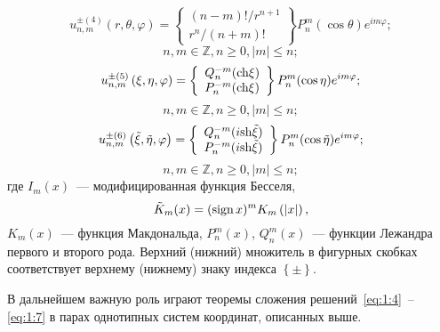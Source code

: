 \begin{equation}\label{eq:1:5}
u_{n,m}^{ \pm (4)}\left( {r,\theta ,\varphi } \right) = \left\{ \begin{array}{l}
(n - m)!/{r^{n + 1}}\\
{r^n}/(n + m)!
\end{array} \right\}P_n^m(\cos \theta ){e^{im\varphi }};
\end{equation}
$$
n,m \in \mathbb{Z}, n\ge 0, |m| \le n;
$$
\begin{equation}\label{eq:1:6}
u_{n,m}^{ \pm (5)}\left( {\xi ,\eta ,\varphi } \right) = \left\{ \begin{array}{l}
Q_n^{ - m}({\mathop{\rm ch}\nolimits} \xi )\\
P_n^{ - m}({\mathop{\rm ch}\nolimits} \xi )
\end{array} \right\}P_n^m(\cos \eta ){e^{im\varphi }};
\end{equation}
$$
n,m \in \mathbb{Z}, n\ge 0, |m| \le n;
$$
\begin{equation}\label{eq:1:7}
u_{n,m}^{ \pm (6)}\left( {\tilde \xi ,\tilde \eta ,\varphi } \right) = \left\{ \begin{array}{l}
Q_n^{ - m}(i{\mathop{\rm sh}\nolimits} \tilde \xi )\\
P_n^{ - m}(i{\mathop{\rm sh}\nolimits} \tilde \xi )
\end{array} \right\}P_n^m(\cos \tilde \eta ){e^{im\varphi }};
\end{equation}
$$
n,m \in \mathbb{Z}, n\ge 0, |m| \le n;
$$
\noindent где ${I_m}(x)$~--- модифицированная функция Бесселя, $${\tilde K_m}(x) = {({\rm{sign}}{\mkern 1mu} {\kern 1pt} x)^m}{K_m}\left( {|x|} \right),$$
${K_m}(x)$~--- функция Макдональда, $P_n^m(x)$, $Q_n^m(x)$~--- функции Лежандра первого и второго рода. Верхний (нижний) множитель в фигурных скобках соответствует верхнему (нижнему) знаку индекса $\left\{  \pm  \right\}$.

В дальнейшем важную роль играют теоремы сложения решений~\eqref{eq:1:4}~-- \eqref{eq:1:7} в парах однотипных систем координат, описанных выше.

